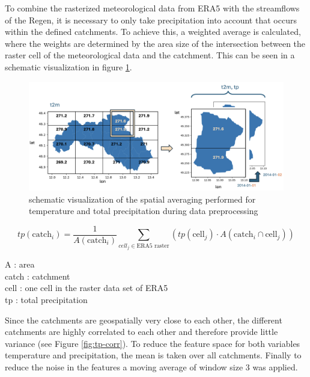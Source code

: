 \documentclass[
]{krantz}
\begin{document}
To combine the rasterized meteorological data from ERA5 with the streamflows of the Regen, it is necessary to only take precipitation into account that occurs within the defined catchments. To achieve this, a weighted average is calculated, where the weights are determined by the area size of the intersection between the raster cell of the meteorological data and the catchment. This can be seen in a schematic visualization in figure \ref{fig:spatial-avg}.

\begin{figure}

{\centering \includegraphics[width=0.8\linewidth]{work/07-hydroLSTM/images/spatial_averaging} 

}

\caption{schematic visualization of the spatial averaging performed for temperature and total precipitation during data preprocessing}\label{fig:spatial-avg}
\end{figure}

\[ tp(\text{catch}_i) = \frac{1}{A(\text{catch}_i)} \sum_{cell_j \in \text{ERA5 raster}} \left( tp(\text{cell}_j) \cdot A(\text{catch}_i \cap \text{cell}_j) \right) \tag{1} \]

A : area\\
catch : catchment\\
cell : one cell in the raster data set of ERA5\\
tp : total precipitation

Since the catchments are geospatially very close to each other, the different catchments are highly correlated to each other and therefore provide little variance (see Figure \ref{fig:tp-corr}). To reduce the feature space for both variables temperature and precipitation, the mean is taken over all catchments. Finally to reduce the noise in the features a moving average of window size 3 was applied.
\end{document}
